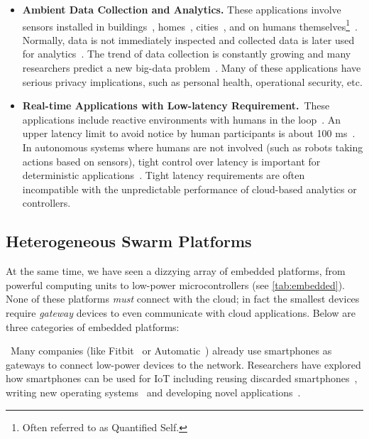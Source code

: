 \begin{itemize}[topsep=5pt]

\item \textbf{Ambient Data Collection and Analytics.} These applications involve
  sensors installed in buildings~\cite{dawson2010smap},
  homes~\cite{hnat2011hitchhiker}, cities~\cite{sfpark}, and on humans
  themselves\footnote{Often referred to as Quantified Self.}~\cite{fitbit,
    swan2013quantified}.  Normally, data is not immediately inspected and
  collected data is later used for analytics~\cite{kolter2011redd}.  The trend
  of data collection is constantly growing and many researchers predict a new
  big-data problem~\cite{diaz2012big, zaslavsky2013sensing}.  Many of these
  applications have serious privacy implications, such as personal health,
  operational security, etc.

\item \textbf{Real-time Applications with Low-latency Requirement.}~These
  applications include reactive environments with humans in the
  loop~\cite{cooperstock1997reactive}.
An upper latency limit to avoid notice by human participants is about 100
ms~\cite{nielsen1994usability}.  In autonomous systems where humans are not
involved (such as robots taking actions based on sensors), tight control over
latency is important for deterministic
applications~\cite{eidson2012distributed}.  Tight latency requirements are often
incompatible with the unpredictable performance of cloud-based analytics or
controllers.

\end{itemize}

\subsection{Heterogeneous Swarm Platforms}
\label{sec:swarm-platforms}

At the same time, we have seen a dizzying array of embedded platforms, from
powerful computing units to low-power microcontrollers (see
\autoref{tab:embedded}). None of these platforms \emph{must} connect with the
cloud; in fact the smallest devices require \emph{gateway} devices to even
communicate with cloud applications. Below are three categories of embedded
platforms:

~Many companies (like Fitbit~\cite{fitbit} or
Automatic~\cite{automatic}) already use smartphones as gateways to connect
low-power devices to the network.  Researchers have explored how smartphones can
be used for IoT including reusing discarded smartphones~\cite{challen2014mote},
writing new operating systems~\cite{janos} and developing novel
applications~\cite{hong2014smartphone}.

